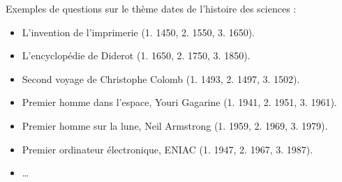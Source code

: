 \documentclass[class=report,crop=false, 12pt]{standalone}
\begin{document}
\begin{activite}
  
Exemples de questions sur le thème \og dates de l'histoire des sciences \fg{} :
\begin{itemize}
  \item L'invention de l'imprimerie (1. 1450, 2. 1550, 3. 1650).
  \item L'encyclopédie de Diderot (1. 1650, 2. 1750, 3. 1850).
  \item Second voyage de Christophe Colomb (1. 1493, 2. 1497, 3. 1502).
  \item Premier homme dans l'espace, Youri Gagarine (1. 1941, 2. 1951, 3. 1961).
  \item Premier homme sur la lune, Neil Armstrong (1. 1959, 2. 1969, 3. 1979).
  \item Premier ordinateur électronique, ENIAC (1. 1947, 2. 1967, 3. 1987).
  \item \ldots
\end{itemize} 

\end{activite}
\end{document}
